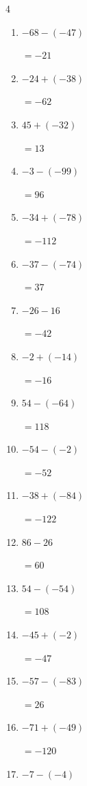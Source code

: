 \begin{multicols}{4}
\begin{enumerate}
  \item $-68-(-47)$

        $=-21$

  \item $-24+(-38)$

        $=-62$

  \item $45+(-32)$

        $=13$

  \item $-3-(-99)$

        $=96$

  \item $-34+(-78)$

        $=-112$

  \item $-37-(-74)$

        $=37$

  \item $-26-16$

        $=-42$

  \item $-2+(-14)$

        $=-16$

\columnbreak %

  \item $54-(-64)$

        $=118$

  \item $-54-(-2)$

        $=-52$

  \item $-38+(-84)$

        $=-122$

  \item $86-26$

        $=60$

  \item $54-(-54)$

        $=108$

  \item $-45+(-2)$

        $=-47$

  \item $-57-(-83)$

        $=26$

  \item $-71+(-49)$

        $=-120$

  \item $-7-(-4)$


\end{enumerate}
\end{multicols}
